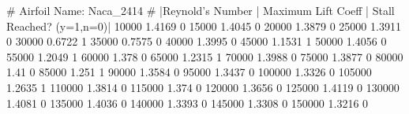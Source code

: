 # Airfoil Name: Naca_2414
# |Reynold's Number | Maximum Lift Coeff | Stall Reached? (y=1,n=0)|
10000 1.4169 0
15000 1.4045 0
20000 1.3879 0
25000 1.3911 0
30000 0.6722 1
35000 0.7575 0
40000 1.3995 0
45000 1.1531 1
50000 1.4056 0
55000 1.2049 1
60000 1.378 0
65000 1.2315 1
70000 1.3988 0
75000 1.3877 0
80000 1.41 0
85000 1.251 1
90000 1.3584 0
95000 1.3437 0
100000 1.3326 0
105000 1.2635 1
110000 1.3814 0
115000 1.374 0
120000 1.3656 0
125000 1.4119 0
130000 1.4081 0
135000 1.4036 0
140000 1.3393 0
145000 1.3308 0
150000 1.3216 0
